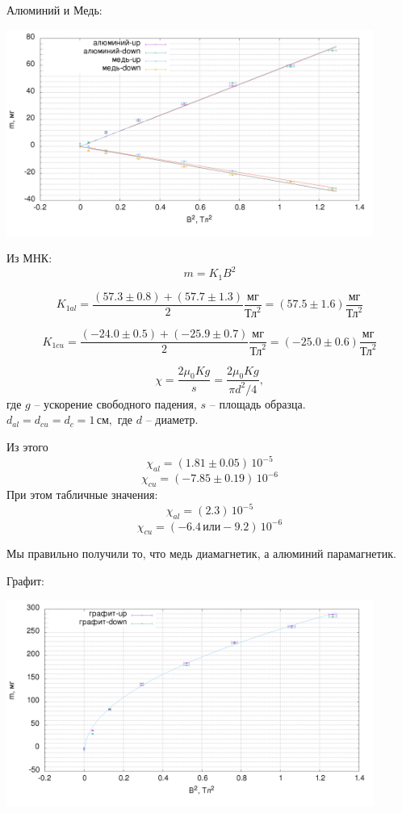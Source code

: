 \documentclass[a4paper,12pt]{article}
\begin{document}
\newpage
Алюминий и Медь:
\begin{center}
\includegraphics[width=0.90\textwidth]{al-cu.png}
\end{center}

Из МНК:
$$m = K_1 B^2$$

$$K_{1al} = \frac{(57.3\pm0.8) + (57.7\pm1.3)}{2}\frac{\text{мг}}{\text{Тл}^2}=(57.5\pm1.6)\frac{\text{мг}}{\text{Тл}^2}$$

$$K_{1cu} = \frac{(-24.0\pm0.5) + (-25.9\pm0.7)}{2}\frac{\text{мг}}{\text{Тл}^2}=(-25.0\pm0.6)\frac{\text{мг}}{\text{Тл}^2}$$

$$\chi = \frac{2 \mu_0 K g} {s} = \frac{2 \mu_0 K g} {\pi d^2/4} ,$$
где $g$ -- ускорение свободного падения, $s$ -- площадь образца. $d_{al}=d_{cu}=d_{c}=1\,\text{см},$ где $d$ -- диаметр.

Из этого
$$\chi_{al} = (1.81\pm0.05)\,10^{-5}$$
$$\chi_{cu} = (-7.85\pm0.19)\,10^{-6}$$
При этом табличные значения:
$$\chi_{al} = (2.3)\,10^{-5}$$
$$\chi_{cu} = (-6.4\,\text{или}-9.2)\,10^{-6}$$

Мы правильно получили то, что медь диамагнетик, а алюминий парамагнетик.

\newpage

Графит:
\begin{center}
\includegraphics[width=0.90\textwidth]{c.png}
\end{center}
\end{document}
